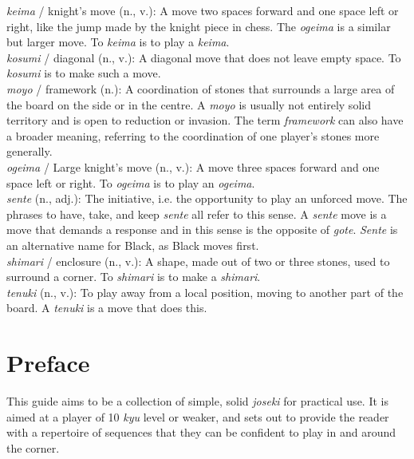 \documentclass[a5paper,12pt,twoside]{book} %
\newcounter{joseki}                 %
\begin{document}
\noindent \textit{keima} / knight’s move (n., v.): A move two spaces forward and one space left or right, like the jump made by the knight piece in chess. The \textit{ogeima} is a similar but larger move. To \textit{keima} is to play a \textit{keima}.\\

\noindent \textit{kosumi} / diagonal (n., v.): A diagonal move that does not leave empty space. To \textit{kosumi} is to make such a move.\\

\noindent \textit{moyo} / framework (n.): A coordination of stones that surrounds a large area of the board on the side or in the centre. A \textit{moyo} is usually not entirely solid territory and is open to reduction or invasion. The term \textit{framework} can also have a broader meaning, referring to the coordination of one player's stones more generally.\\

\noindent \textit{ogeima} / Large knight's move (n., v.): A move three spaces forward and one space left or right. To \textit{ogeima} is to play an \textit{ogeima}.\\

\noindent \textit{sente} (n., adj.): The initiative, i.e. the opportunity to play an unforced move. The phrases to have, take, and keep \textit{sente} all refer to this sense. A \textit{sente} move is a move that demands a response and in this sense is the opposite of \textit{gote}. \textit{Sente} is an alternative name for Black, as Black moves first.\\

\noindent \textit{shimari} / enclosure (n., v.): A shape, made out of two or three stones, used to surround a corner. To \textit{shimari} is to make a \textit{shimari}.\\

\noindent \textit{tenuki}  (n., v.): To play away from a local position, moving to another part of the board. A \textit{tenuki} is a move that does this.

\clearpage

\tableofcontents


\chapter{Preface}
This guide aims to be a collection of simple, solid \textit{joseki} for practical use. It is aimed at a player of 10 \textit{kyu} level or weaker, and sets out to provide the reader with a repertoire of sequences that they can be confident to play in and around the corner.\\
\end{document}
